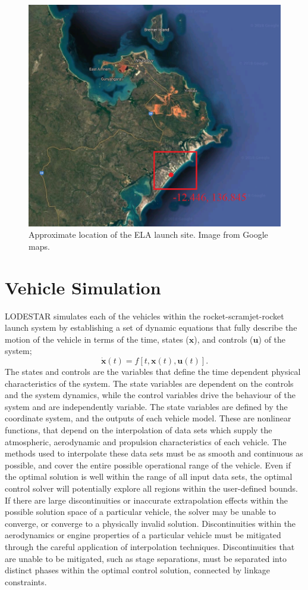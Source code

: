 \begin{figure}[ht]
	\centering
	\includegraphics[width=0.7\linewidth]{figures/4_LODESTAR/SiteLocation}
	\caption{Approximate location of the ELA launch site. Image from Google maps.}
	\label{fig:SiteLocation}
\end{figure}


\section{Vehicle Simulation}

LODESTAR simulates each of the vehicles within the rocket-scramjet-rocket launch system by establishing a set of dynamic equations that fully describe the motion of the vehicle in terms of the time, states ($\mathbf{x}$), and controls ($\mathbf{u}$) of the system;
\begin{equation}
\dot{\textbf{x}}(t) = f[t,\textbf{x}(t),\textbf{u}(t)].
\end{equation}
 The states and controls are the variables that define the time dependent physical characteristics of the system. The state variables are dependent on the controls and the system dynamics, while the control variables drive the behaviour of the system and are independently variable.  
The state variables are defined by the coordinate system, and the outputs of each vehicle model. These are nonlinear functions, that depend on the interpolation of data sets which supply the atmospheric, aerodynamic and propulsion characteristics of each vehicle. 
The methods used to interpolate these data sets must be as smooth and continuous as possible, and cover the entire possible operational range of the vehicle. 
Even if the optimal solution is well within the range of all input data sets, the optimal control solver will potentially explore all regions within the user-defined bounds. 
If there are large discontinuities or inaccurate extrapolation effects within the possible solution space of a particular vehicle, the solver may be unable to converge, or converge to a physically invalid solution. 
Discontinuities within the aerodynamics or engine properties of a particular vehicle must be mitigated through the careful application of interpolation techniques. Discontinuities that are unable to be mitigated, such as stage separations, must be separated into distinct phases within the optimal control solution, connected by linkage constraints. 

